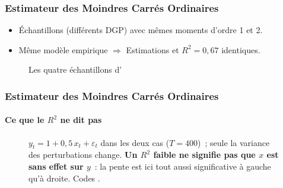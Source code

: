 \documentclass[10pt]{beamer}
\begin{document}
\begin{frame}[c]
  \frametitle{Estimateur des Moindres Carrés Ordinaires}

  \begin{itemize}

  \item Échantillons (différents DGP) avec mêmes moments d'ordre 1 et 2.\newline

  \item Même modèle empirique $\Rightarrow$ Estimations et $R^2=0,67$ identiques.

  \end{itemize}

  \begin{figure}
    \centering
    \scalebox{.44}{
      }
    \caption{Les quatre échantillons d'\cite{Anscombe1973}}
    \label{fig:02}
  \end{figure}

\end{frame}


\begin{frame}[c]
  \frametitle{Estimateur des Moindres Carrés Ordinaires}
  \framesubtitle{Ce que le $R^2$ ne dit pas}

  \begin{figure}
    \centering
    \scalebox{.46}{}
    \caption{$y_t = 1 + 0{,}5\,x_t + \varepsilon_t$ dans les deux cas ($T=400$)~; seule la variance des perturbations change. \textbf{Un $R^2$ faible ne signifie pas que $x$ est sans effet sur $y$}~: la pente est ici tout aussi significative à gauche qu'à droite. Codes .}
  \end{figure}

\end{frame}
\end{document}
